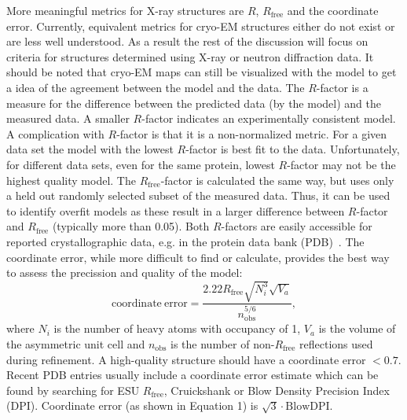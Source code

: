 \documentclass[9pt,bestpractices]{livecoms}
\begin{document}
More meaningful metrics for X-ray structures are $R$, $R_{\mathrm{free}}$ and the coordinate error. Currently, equivalent metrics for cryo-EM structures either do not exist or are less well understood.  As a result the rest of the discussion will focus on criteria for structures determined using X-ray or neutron diffraction data.  It should be noted that cryo-EM maps can still be visualized with the model to get a idea of the agreement between the model and the data.
%
The $R$-factor is a measure for the difference between the predicted data (by the model) and the measured data. A smaller $R$-factor indicates an experimentally consistent model. A complication with $R$-factor is that it is a non-normalized metric. For a given data set the model with the lowest $R$-factor is best fit to the data.  Unfortunately, for different data sets, even for the same protein, lowest $R$-factor may not be the highest quality model. 
%
The $R_{\mathrm{free}}$-factor is calculated the same way, but uses only a held out randomly selected subset of the measured data. Thus, it can be used to identify overfit models as these result in a larger difference between $R$-factor and $R_{\mathrm{free}}$ (typically more than 0.05).
Both $R$-factors are easily accessible for reported crystallographic data, e.g. in the protein data bank (PDB)~\cite{bermanProteinDataBank2000}. 
%
The coordinate error, while more difficult to find or calculate, provides the best way to assess the precission and quality of the model:
%
\begin{equation}
    \mathrm{coordinate\ error} = \frac{2.22 R_{\mathrm{free}}\sqrt{N_i^3}\sqrt{V_a}} {n_{\mathrm{obs}}^{5/6}},
    \label{eq:coordinate_error}
\end{equation}
%
where $N_i$ is the number of heavy atoms with occupancy of 1, $V_a$ is the volume of the asymmetric unit cell and $n_{\mathrm{obs}}$ is the number of non-$R_{\mathrm{free}}$ reflections used during refinement. A high-quality structure should have a coordinate error $<0.7$. Recent PDB entries usually include a coordinate error estimate which can be found by searching for ESU $R_{\mathrm{free}}$, Cruickshank or Blow Density Precision Index (DPI). Coordinate error (as shown in Equation 1) is $\sqrt{3}\cdot \mathrm{BlowDPI}$. 
\end{document}
